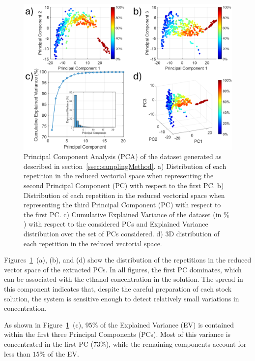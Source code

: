 \documentclass[journal,twoside,web]{ieeecolor}
\begin{document}
\begin{figure}[!t]
	\centering
	\includegraphics [trim = 0mm 0mm 0mm 0mm, clip, width=1\columnwidth]{figures/fig5_3.png}
	\caption{Principal Component Analysis (PCA) of the dataset generated as described in section~\ref{ssec:samplingMethod}. a) Distribution of each repetition in the reduced vectorial space when representing the second Principal Component (PC) with respect to the first PC. b) Distribution of each repetition in the reduced vectorial space when representing the third Principal Component (PC) with respect to the first PC. c) Cumulative Explained Variance of the dataset (in $\%$) with respect to the considered PCs and Explained Variance distribution over the set of PCs considered. d) 3D distribution of each repetition in the reduced vectorial space.}
	\label{fig:pcaAnalysis}
	\vspace{-0.3cm}
\end{figure}

Figures~\ref{fig:pcaAnalysis}~(a), (b), and (d) show the distribution of the repetitions in the reduced vector space of the extracted PCs. In all figures, the first PC dominates, which can be associated with the ethanol concentration in the solution. The spread in this component indicates that, despite the careful preparation of each stock solution, the system is sensitive enough to detect relatively small variations in concentration.

As shown in Figure~\ref{fig:pcaAnalysis}~(c), $95\%$ of the Explained Variance (EV) is contained within the first three Principal Components (PCs). Most of this variance is concentrated in the first PC ($73\%$), while the remaining components account for less than $15\%$ of the EV.
\end{document}

